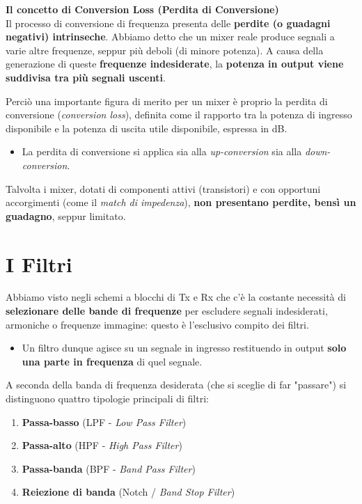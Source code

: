 \documentclass[openany,a4paper,12pt]{book}
\begin{document}
\textbf{Il concetto di Conversion Loss (Perdita di Conversione)}\\
Il processo di conversione di frequenza presenta delle \textbf{perdite (o guadagni negativi) intrinseche}. Abbiamo detto che un mixer reale produce segnali a varie altre frequenze, seppur più deboli (di minore potenza). A causa della generazione di queste \textbf{frequenze indesiderate}, la \textbf{potenza in output viene suddivisa tra più segnali uscenti}. 

Perciò una importante figura di merito per un mixer è proprio la perdita di conversione (\textit{conversion loss}), definita come il rapporto tra la potenza di ingresso disponibile e la potenza di uscita utile disponibile, espressa in dB.
\begin{itemize}[label=\textcolor{OpticRed}{\textbullet}]
    \item La perdita di conversione si applica sia alla \textit{up-conversion} sia alla \textit{down-conversion}.
\end{itemize}

\begin{nota}
    Talvolta i mixer, dotati di componenti attivi (transistori) e con opportuni accorgimenti (come il \textit{match di impedenza}), \textbf{non presentano perdite, bensì un guadagno}, seppur limitato.
\end{nota}


\section{I Filtri}

Abbiamo visto negli schemi a blocchi di Tx e Rx che c'è la costante necessità di \textbf{selezionare delle bande di frequenze} per escludere segnali indesiderati, armoniche o frequenze immagine: questo è l'esclusivo compito dei filtri.

\begin{itemize}[label=\textcolor{PoliBlue}{\textbullet}]
    \item Un filtro dunque agisce su un segnale in ingresso restituendo in output \textbf{solo una parte in frequenza} di quel segnale.
\end{itemize}

A seconda della banda di frequenza desiderata (che si sceglie di far "passare") si distinguono quattro tipologie principali di filtri:
\begin{enumerate}
    \item \textbf{Passa-basso} (LPF - \textit{Low Pass Filter})
    \item \textbf{Passa-alto} (HPF - \textit{High Pass Filter})
    \item \textbf{Passa-banda} (BPF - \textit{Band Pass Filter})
    \item \textbf{Reiezione di banda} (Notch / \textit{Band Stop Filter})
\end{enumerate}
\end{document}
